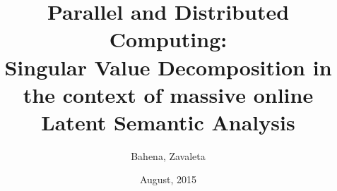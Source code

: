 \documentclass{beamer}
\title{Parallel and Distributed Computing: \\Singular Value Decomposition in the
context of massive online Latent Semantic Analysis}
\author{Bahena, Zavaleta}%
\institute{CINVESTAV - ORACLE}
\date{August, 2015}
\begin{document}
	\begin{frame}[plain]
	  \titlepage
	\end{frame}
  
  
  
  
    
  
\end{document}
